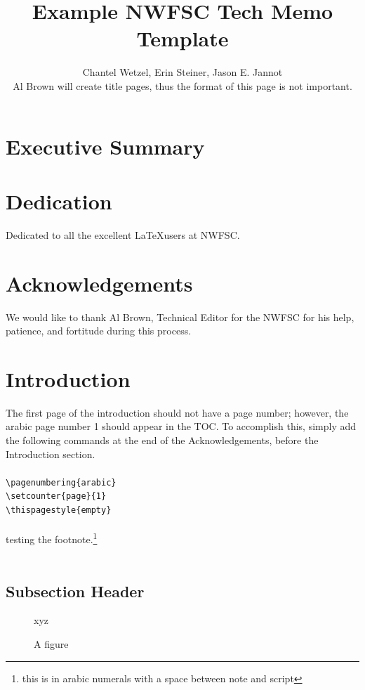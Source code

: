 \documentclass[12pt]{article}
\title{\textcolor[cmyk]{1.00,0.83,0.41,0.36}{Example NWFSC Tech Memo Template}}
\author{Chantel Wetzel, Erin Steiner, Jason E. Jannot\\
\small{Al Brown will create title pages, thus the format of this page is not important.}}
\begin{document}
\maketitle
\newpage
\normalfont %
\normalsize %
\setcounter{page}{3}     %
\tableofcontents
\newpage
\listoftables
\newpage
\listoffigures
\newpage
\section{Executive Summary}
\lipsum[1]
\lipsum[2]
\newpage
\section{Dedication}
Dedicated to all the excellent \LaTeX users at NWFSC.
\newpage
\section{Acknowledgements}
We would like to thank Al Brown, Technical Editor for the NWFSC for his help, patience, and fortitude during this process.
\newpage
{}
\setcounter{page}{1}
\thispagestyle{empty}	
\section{Introduction}
The first page of the introduction should not have a page number; however, the arabic page number 1 should appear in the TOC. To accomplish this, simply add the following commands at the end of the Acknowledgements, before the Introduction section.\\
\\
\texttt{\textbackslash pagenumbering\{arabic\}\\
	\textbackslash setcounter\{page\}\{1\}\\
	\textbackslash thispagestyle\{empty\}\\
}
\\
testing the footnote.\footnote{this is in arabic numerals with a space between note and script}\\
\\
\lipsum[3]

\subsection{Subsection Header}
\lipsum[3]
\begin{figure}[h]
\caption{A figure}
\centering xyz
\end{figure}
\end{document}
